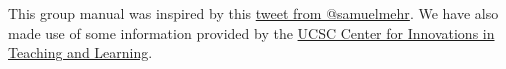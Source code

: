 \documentclass[fleqn,10pt]{wlscirep}
\begin{document}
This group manual was inspired by this \href{https://twitter.com/samuelmehr/status/1139733291899080705}{tweet from @samuelmehr}. We have also made use of some information provided by the \href{https://citl.ucsc.edu}{UCSC Center for Innovations in Teaching and Learning}.






%

\newpage

\end{document}
